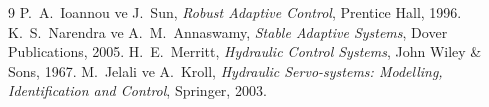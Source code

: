 \documentclass[12pt,a4paper]{article}
\begin{document}
\begin{thebibliography}{9}
 P.~A.~Ioannou ve J.~Sun, \textit{Robust Adaptive Control}, Prentice Hall, 1996.
 K.~S.~Narendra ve A.~M.~Annaswamy, \textit{Stable Adaptive Systems}, Dover Publications, 2005.
 H.~E.~Merritt, \textit{Hydraulic Control Systems}, John Wiley \& Sons, 1967.
 M.~Jelali ve A.~Kroll, \textit{Hydraulic Servo-systems: Modelling, Identification and Control}, Springer, 2003.
\end{thebibliography}
\end{document}
